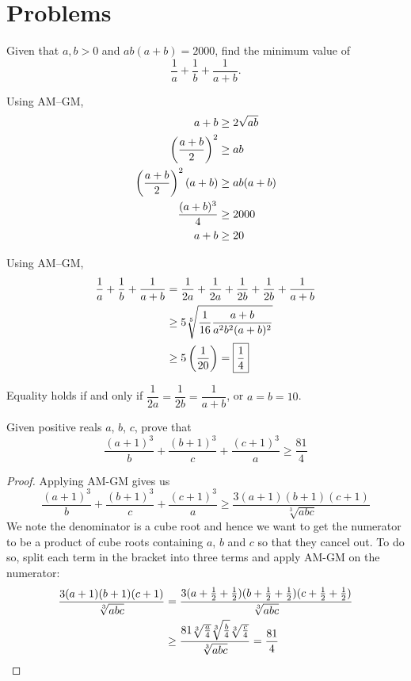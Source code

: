 \section*{Problems}
\begin{prbm}
Given that $a,b>0$ and $ab(a+b)=2000$, find the minimum value of 
\[ \frac{1}{a}+\frac{1}{b}+\frac{1}{a+b}. \]
\end{prbm}
\begin{solution}
Using AM--GM, 
\begin{align*}
a+b &\ge 2\sqrt{ab} \\
\left(\frac{a+b}{2}\right)^2 &\ge ab \\
\left(\frac{a+b}{2}\right)^2(a+b) &\ge ab(a+b) \\
\frac{(a+b)^3}{4} &\ge 2000 \\
a+b &\ge 20
\end{align*}

Using AM--GM,
\begin{align*}
\frac{1}{a}+\frac{1}{b}+\frac{1}{a+b}
&= \frac{1}{2a}+\frac{1}{2a}+\frac{1}{2b}+\frac{1}{2b}+\frac{1}{a+b} \\
&\ge 5\sqrt[5]{\frac{1}{16}\frac{a+b}{a^2b^2(a+b)^2}} \\
&\ge 5\left(\frac{1}{20}\right) = \boxed{\frac{1}{4}}
\end{align*}

Equality holds if and only if $\dfrac{1}{2a}=\dfrac{1}{2b}=\dfrac{1}{a+b}$, or $a=b=10$.
\end{solution}
\pagebreak

\begin{prbm}
Given positive reals $a$, $b$, $c$, prove that 
\[ \frac{(a+1)^3}{b} + \frac{(b+1)^3}{c} + \frac{(c+1)^3}{a} \ge \frac{81}{4} \]
\end{prbm}

\begin{proof}
Applying AM-GM gives us
\[ \frac{(a+1)^3}{b} + \frac{(b+1)^3}{c} + \frac{(c+1)^3}{a} \ge \frac{3(a+1)(b+1)(c+1)}{\sqrt[3]{abc}} \]
We note the denominator is a cube root and hence we want to get the numerator to be a product of cube roots containing $a$, $b$ and $c$ so that they cancel out. To do so, split each term in the bracket into three terms and apply AM-GM on the numerator:
\begin{align*}
\frac{3(a+1)(b+1)(c+1)}{\sqrt[3]{abc}} 
&= \frac{3(a+\frac{1}{2}+\frac{1}{2})(b+\frac{1}{2}+\frac{1}{2})(c+\frac{1}{2}+\frac{1}{2})}{\sqrt[3]{abc}} \\
&\ge \frac{81\sqrt[3]{\frac{a}{4}}\sqrt[3]{\frac{b}{4}}\sqrt[3]{\frac{c}{4}}}{\sqrt[3]{abc}} = \frac{81}{4}
\end{align*}
\end{proof}
\pagebreak

